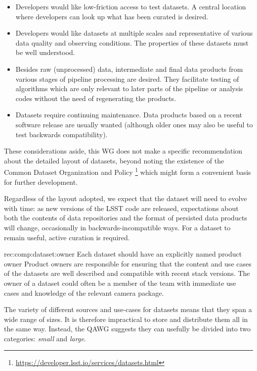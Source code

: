 \begin{itemize}
\item{
    Developers would like low-friction access to test datasets.
    A central location where developers can look up what has been curated is desired.
}
\item{
    Developers would like datasets at multiple scales and representative of various data quality and observing conditions.
    The properties of these datasets must be well understood.
}
\item{
    Besides raw (unprocessed) data, intermediate and final data products from various stages of pipeline processing are desired.
    They facilitate testing of algorithms which are only relevant to later parts of the pipeline or analysis codes without the need of regenerating the products.
}
\item{
    Datasets require continuing maintenance.
    Data products based on a recent software release are usually wanted (although older ones may also be useful to test backwards compatibility).
}
\end{itemize}

These considerations aside, this WG does not make a specific recommendation about the detailed layout of datasets, beyond noting the existence of the Common Dataset Organization and Policy \footnote{\url{https://developer.lsst.io/services/datasets.html}} which might form a convenient basis for further development.

Regardless of the layout adopted, we expect that the dataset will need to evolve with time: as new versions of the LSST code are released, expectations about both the contents of data repositories and the format of persisted data products will change, occasionally in backwards-incompatible ways.
For a dataset to remain useful, active curation is required.

\begin{recommendation}
    {rec:comp:dataset:owner}
    {Each dataset should have an explicitly named product owner}
Product owners are responsible for ensuring that the content and use cases of the datasets are well described and compatible with recent stack versions.
The owner of a dataset could often be a member of the team with immediate use cases and knowledge of the relevant camera package.
\end{recommendation}

The variety of different sources and use-cases for datasets means that they span a wide range of sizes.
It is therefore impractical to store and distribute them all in the same way.
Instead, the QAWG suggests they can usefully be divided into two categories: \emph{small} and \emph{large}.

